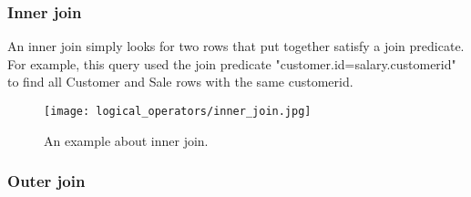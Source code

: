 \subsubsection{Inner join}
{\justify
An inner join simply looks for two rows that put together satisfy a join predicate. For example, this query used the join predicate "customer.id=salary.customerid" to find all Customer and Sale rows with the same customerid.
\par }
{
\begin{figure}[H]
\centering
\texttt{[image: logical\_operators/inner\_join.jpg]}
\caption{An example about inner join.}
\end{figure}
 }
\vspace{0.5cm}
\subsubsection{Outer join}
